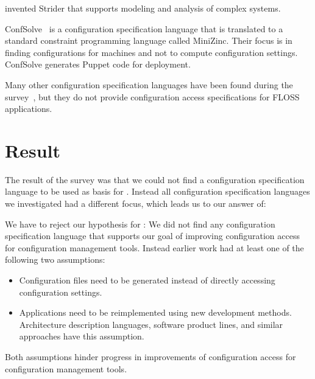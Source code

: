 \citet{lock2005strider} invented Strider that supports modeling and analysis of complex systems.

ConfSolve~\cite{hewson2011modelling,hewson2012declarative} is a configuration specification language that is translated to a standard constraint programming language called MiniZinc.
Their focus is in finding configurations for machines and not to compute configuration settings.
ConfSolve generates Puppet code for deployment.

Many other configuration specification languages have been found during the survey~\cite{roll2003towards,pandey2012investigating,hill2011modeling,anderson2002lcfg,deliverable1996tina,lujak2015orcas,sommerville1992configuration,giese2012industrial,huang2007system%
,novak2005automatic%
,gunther2012software,berger2013survey,magableh2010primitive,friedrich1999consistency}, but they do not provide configuration access specifications for FLOSS applications.

\section{Result}

The result of the survey was that we could not find a configuration specification language to be used as basis for .
Instead all configuration specification languages we investigated had a different focus, which leads us to our answer of:
\rqBackgroundSpecificationLanguages*

\begin{finding}
We have to reject our hypothesis for :
We did not find any configuration specification language that supports our goal of improving configuration access for configuration management tools.
Instead earlier work had at least one of the following two assumptions:
\begin{itemize}
\item Configuration files need to be generated instead of directly accessing configuration settings.
\item Applications need to be reimplemented using new development methods.
Architecture description languages, software product lines, and similar approaches have this assumption.
\end{itemize}
\end{finding}
\par
Both assumptions hinder progress in improvements of configuration access for configuration management tools.



\begingroup
\sloppy
\makeatletter
\g@addto@macro{\UrlBreaks}{\UrlOrds}
\makeatother

\endgroup




